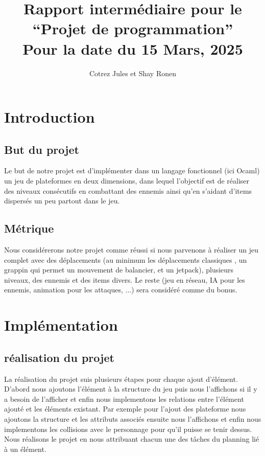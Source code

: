 \documentclass{article}
\title{%
  Rapport intermédiaire pour le ``Projet de programmation''\\
  Pour la date du 15 Mars, 2025%
}
\author{Cotrez Jules et Shay Ronen}
\begin{document}
\maketitle

\section{Introduction}

\subsection{But du projet}
Le but de notre projet est d'implémenter dans un langage fonctionnel (ici Ocaml) un jeu de plateformes en deux dimensions, dans lequel l'objectif
est de réaliser des niveaux consécutifs en combattant des ennemis ainsi qu'en s'aidant d'items dispersés un peu partout dans le jeu.

\subsection{Métrique}
Nous considérerons notre projet comme réussi si nous parvenons à réaliser un jeu complet avec des déplacements (au minimum les déplacements classiques ,
un grappin qui permet un mouvement de balancier, et un jetpack), plusieurs niveaux, des ennemis et des items divers. Le reste (jeu en réseau, IA pour les 
ennemis, animation pour les attaques, ...) sera considéré comme du bonus.

\section{Implémentation}

\subsection{réalisation du projet}
La réalisation du projet suis plusieurs étapes pour chaque ajout d'élément. D'abord nous ajoutons l'élément à la structure du jeu puis nous l'affichons si 
il y a besoin de l'afficher et enfin nous implementons les relations entre l'élément ajouté et les éléments existant. Par exemple pour l'ajout des plateforme nous
ajoutons la structure et les attributs associés ensuite nous l'affichons et enfin nous implementons les collisions avec le personnage pour qu'il puisse se tenir dessus.
Nous réalisons le projet en nous attribuant chacun une des tâches du planning lié à un élément.
\end{document}
